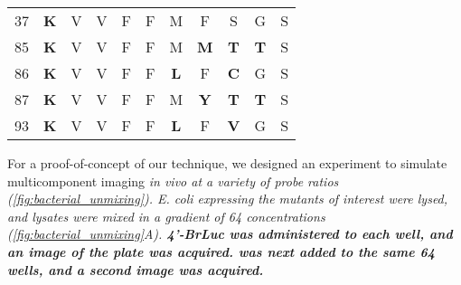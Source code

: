 \begin{table}[]
\begin{tabular}{@{}c | cccccccccc@{}}
  37     & {\color[HTML]{FE0000} \textbf{K}} & {\color[HTML]{333333} V}          & {\color[HTML]{333333} V}          & {\color[HTML]{333333} F}          & {\color[HTML]{333333} F}          & {\color[HTML]{333333} M}          & {\color[HTML]{333333} F}          & {\color[HTML]{333333} S}          & {\color[HTML]{333333} G}          & {\color[HTML]{333333} S}          \\
  85     & {\color[HTML]{FE0000} \textbf{K}} & {\color[HTML]{333333} V}          & {\color[HTML]{333333} V}          & {\color[HTML]{333333} F}          & {\color[HTML]{333333} F}          & {\color[HTML]{333333} M}          & {\color[HTML]{FE0000} \textbf{M}} & {\color[HTML]{FE0000} \textbf{T}} & {\color[HTML]{FE0000} \textbf{T}} & {\color[HTML]{333333} S}          \\
  86     & {\color[HTML]{FE0000} \textbf{K}} & {\color[HTML]{333333} V}          & {\color[HTML]{333333} V}          & {\color[HTML]{333333} F}          & {\color[HTML]{333333} F}          & {\color[HTML]{FE0000} \textbf{L}} & {\color[HTML]{333333} F}          & {\color[HTML]{FE0000} \textbf{C}} & {\color[HTML]{333333} G}          & {\color[HTML]{333333} S}          \\
  87     & {\color[HTML]{FE0000} \textbf{K}} & {\color[HTML]{333333} V}          & {\color[HTML]{333333} V}          & {\color[HTML]{333333} F}          & {\color[HTML]{333333} F}          & {\color[HTML]{333333} M}          & {\color[HTML]{FE0000} \textbf{Y}} & {\color[HTML]{FE0000} \textbf{T}} & {\color[HTML]{FE0000} \textbf{T}} & {\color[HTML]{333333} S}          \\
  93     & {\color[HTML]{FE0000} \textbf{K}} & {\color[HTML]{333333} V}          & {\color[HTML]{333333} V}          & {\color[HTML]{333333} F}          & {\color[HTML]{333333} F}          & {\color[HTML]{FE0000} \textbf{L}} & {\color[HTML]{333333} F}          & {\color[HTML]{FE0000} \textbf{V}} & {\color[HTML]{333333} G}          & {\color[HTML]{333333} S}          \\ \bottomrule
  \end{tabular}
\end{table}

For a proof-of-concept of our technique, we designed an experiment to simulate multicomponent imaging \it{in vivo} at a variety of probe ratios (\autoref{fig:bacterial_unmixing}). \it{E. coli} expressing the mutants of interest were lysed, and lysates were mixed in a gradient of 64 concentrations (\autoref{fig:bacterial_unmixing}A). \bf{4'-BrLuc} was administered to each well, and an image of the plate was acquired. \dluciferin{} was next added to the same 64 wells, and a second image was acquired.

